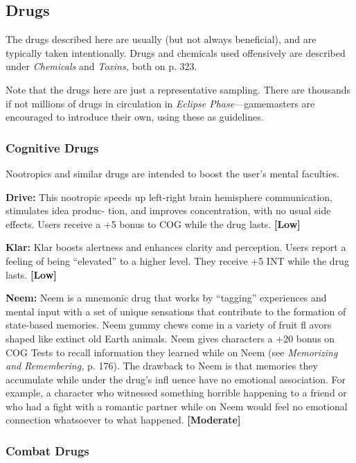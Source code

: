 \subsection{Drugs}

The drugs described here are usually (but not always 
beneficial), and are typically taken intentionally. Drugs 
and chemicals used offensively are described under 
\textit{Chemicals }and\textit{ Toxins,} both on p. 323.

Note that the drugs here are just a representative 
sampling. There are thousands if not millions of 
drugs in circulation in \textit{Eclipse Phase}—gamemasters 
are encouraged to introduce their own, using these 
as guidelines.

\subsubsection{Cognitive Drugs}

Nootropics and similar drugs are intended to boost 
the user's mental faculties.

\textbf{Drive:} This nootropic speeds up left-right brain 
hemisphere communication, stimulates idea produc-
tion, and improves concentration, with no usual side 
effects. Users receive a +5 bonus to COG while the 
drug lasts. \textbf{[Low]}

\textbf{Klar:} Klar boosts alertness and enhances clarity and 
perception. Users report a feeling of being ``elevated'' 
to a higher level. They receive +5 INT while the drug 
lasts. \textbf{[Low]}

\textbf{Neem:} Neem is a mnemonic drug that works by 
``tagging'' experiences and mental input with a set of 
unique sensations that contribute to the formation 
of state-based memories. Neem gummy chews come 
in a variety of fruit fl avors shaped like extinct old 
Earth animals. Neem gives characters a +20 bonus 
on COG Tests to recall information they learned 
while on Neem (see \textit{Memorizing and Remembering,}
p. 176). The drawback to Neem is that memories they 
accumulate while under the drug's infl uence have no 
emotional association. For example, a character who 
witnessed something horrible happening to a friend 
or who had a fight with a romantic partner while on 
Neem would feel no emotional connection whatsoever 
to what happened. \textbf{[Moderate]}

\subsubsection{Combat Drugs}

